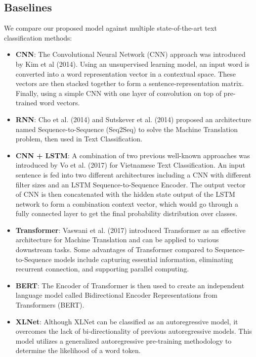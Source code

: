\documentclass[sn-mathphys,Numbered]{sn-jnl}%
\theoremstyle{thmstyleone}%
\theoremstyle{thmstyletwo}%
\theoremstyle{thmstylethree}%
\begin{document}
\subsection{Baselines}
We compare our proposed model against multiple state-of-the-art text classification methods:
\begin{itemize}
\item \textbf{CNN}: The Convolutional Neural Network (CNN) approach was introduced by Kim et al (2014)\cite{Kim2014}. Using an unsupervised learning model, an input word is converted into a word representation vector in a contextual space. These vectors are then stacked together to form a sentence-representation matrix. Finally, using a simple CNN with one layer of convolution on top of pre-trained word vectors.
\item \textbf{RNN}: Cho et al. (2014)\cite{Cho2014} and Sutskever et al. (2014)\cite{Sutskever2014} proposed an architecture named Sequence-to-Sequence (Seq2Seq) to solve the Machine Translation problem, then used in Text Classification.
\item \textbf{CNN + LSTM}: A combination of two previous well-known approaches was introduced by Vo et al. (2017)\cite{Vo2017} for Vietnamese Text Classification. An input sentence is fed into two different architectures including a CNN with different filter sizes and an LSTM Sequence-to-Sequence Encoder. The output vector of CNN is then concatenated with the hidden state output of the LSTM network to form a combination context vector, which would go through a fully connected layer to get the final probability distribution over classes.
\item \textbf{Transformer}: Vaswani et al. (2017)\cite{Vaswani2017} introduced Transformer as an effective architecture for Machine Translation and can be applied to various downstream tasks. Some advantages of Transformer compared to Sequence-to-Sequence models include capturing essential information, eliminating recurrent connection, and supporting parallel computing.
\item \textbf{BERT}: The Encoder of Transformer is then used to create an independent language model called Bidirectional Encoder Representations from Transformers (BERT)\cite{Devlin2019}.
\item \textbf{XLNet}: Although XLNet can be classified as an autoregressive model, it overcomes the lack of bi-directionality of previous autoregressive models. This model utilizes a generalized autoregressive pre-training methodology to determine the likelihood of a word token\cite{Yang2019}.
\end{itemize}
\end{document}
